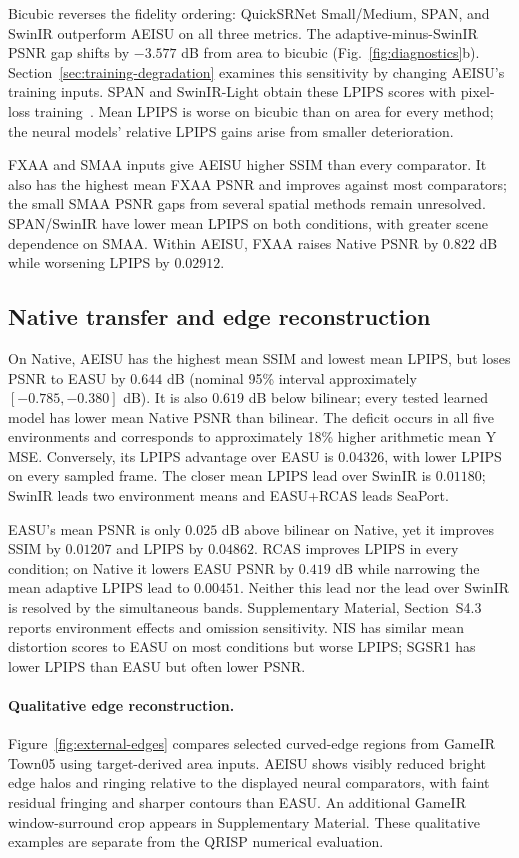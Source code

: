 \documentclass[10pt,twocolumn,letterpaper]{article}
\newcommand{\model}{AEISU}
\begin{document}
Bicubic reverses the fidelity ordering: QuickSRNet Small/Medium, SPAN, and SwinIR outperform \model{} on all three metrics.
The adaptive-minus-SwinIR PSNR gap shifts by $-3.577$ dB from area to bicubic (Fig.~\ref{fig:diagnostics}b).
Section~\ref{sec:training-degradation} examines this sensitivity by changing \model{}'s training inputs.
SPAN and SwinIR-Light obtain these LPIPS scores with pixel-loss training~\cite{wan2024span,liang2021swinir,berger2023quicksrnet}.
Mean LPIPS is worse on bicubic than on area for every method; the neural models' relative LPIPS gains arise from smaller deterioration.

FXAA and SMAA inputs give \model{} higher SSIM than every comparator.
It also has the highest mean FXAA PSNR and improves against most comparators; the small SMAA PSNR gaps from several spatial methods remain unresolved.
SPAN/SwinIR have lower mean LPIPS on both conditions, with greater scene dependence on SMAA.
Within \model{}, FXAA raises Native PSNR by $0.822$ dB while worsening LPIPS by $0.02912$.

\subsection{Native transfer and edge reconstruction}
On Native, \model{} has the highest mean SSIM and lowest mean LPIPS, but loses PSNR to EASU by $0.644$ dB (nominal 95\% interval approximately $[-0.785,-0.380]$ dB).
It is also $0.619$ dB below bilinear; every tested learned model has lower mean Native PSNR than bilinear.
The deficit occurs in all five environments and corresponds to approximately 18\% higher arithmetic mean Y MSE.
Conversely, its LPIPS advantage over EASU is $0.04326$, with lower LPIPS on every sampled frame.
The closer mean LPIPS lead over SwinIR is $0.01180$; SwinIR leads two environment means and EASU+RCAS leads SeaPort.

EASU's mean PSNR is only $0.025$ dB above bilinear on Native, yet it improves SSIM by $0.01207$ and LPIPS by $0.04862$.
RCAS improves LPIPS in every condition; on Native it lowers EASU PSNR by $0.419$ dB while narrowing the mean adaptive LPIPS lead to $0.00451$.
Neither this lead nor the lead over SwinIR is resolved by the simultaneous bands.
Supplementary Material, Section~S4.3 reports environment effects and omission sensitivity.
NIS has similar mean distortion scores to EASU on most conditions but worse LPIPS; SGSR1 has lower LPIPS than EASU but often lower PSNR.

\paragraph{Qualitative edge reconstruction.}
Figure~\ref{fig:external-edges} compares selected curved-edge regions from GameIR Town05 using target-derived area inputs.
\model{} shows visibly reduced bright edge halos and ringing relative to the displayed neural comparators, with faint residual fringing and sharper contours than EASU.
An additional GameIR window-surround crop appears in Supplementary Material. These qualitative examples are separate from the QRISP numerical evaluation.
\end{document}
